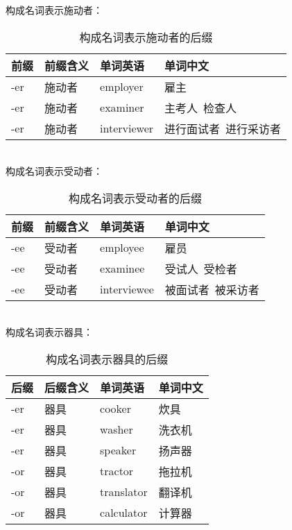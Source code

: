 \documentclass[UTF8]{ctexart}
\begin{document}
    构成名词表示施动者：\vspace{5pt}
    \begin{table}[h!]
        \begin{center}
            \ttfamily
            \begin{tabular}{p{40pt}|p{80pt}|p{80pt}|p{120pt}}
                \hline
                前缀&前缀含义&单词英语&单词中文\\ \hline
                -er&施动者&employer&雇主\\ \hline
                -er&施动者&examiner&主考人~检查人\\ \hline
                -er&施动者&interviewer&进行面试者~进行采访者\\ \hline
            \end{tabular}
            \rmfamily
            \caption{构成名词表示施动者的后缀}
        \end{center}
    \end{table}\\
    构成名词表示受动者：\vspace{5pt}
    \begin{table}[h!]
        \begin{center}
            \ttfamily
            \begin{tabular}{p{40pt}|p{80pt}|p{80pt}|p{120pt}}
                \hline
                前缀&前缀含义&单词英语&单词中文\\ \hline
                -ee&受动者&employee&雇员\\ \hline
                -ee&受动者&examinee&受试人~受检者\\ \hline
                -ee&受动者&interviewee&被面试者~被采访者\\ \hline
            \end{tabular}
            \rmfamily
            \caption{构成名词表示受动者的后缀}
        \end{center}
    \end{table}\\
    构成名词表示器具：\vspace{5pt}
    \begin{table}[h!]
        \begin{center}
            \ttfamily
            \begin{tabular}{p{40pt}|p{80pt}|p{80pt}|p{80pt}}
                \hline
                后缀&后缀含义&单词英语&单词中文\\ \hline
                -er&器具&cooker&炊具\\ \hline
                -er&器具&washer&洗衣机\\ \hline
                -er&器具&speaker&扬声器\\ \hline
                -or&器具&tractor&拖拉机\\ \hline
                -or&器具&translator&翻译机\\ \hline
                -or&器具&calculator&计算器\\ \hline
            \end{tabular}
            \rmfamily
            \caption{构成名词表示器具的后缀}
        \end{center}
    \end{table}\\
\end{document}
